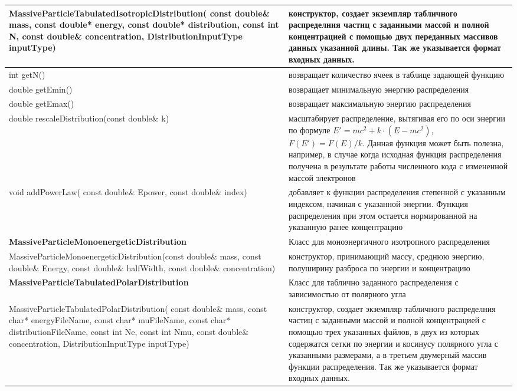 \begin{small}
\begin{xtabular}{|p{0.52\textwidth}|p{0.48\textwidth}|}
		\hline
		MassiveParticleTabulatedIsotropicDistribution( const double\& mass, const double* energy, const double* distribution, const int N, const double\& concentration, DistributionInputType inputType) & конструктор, создает экземпляр табличного распределния частиц с заданными массой и полной концентрацией с помощью двух переданных массивов данных указанной длины. Так же указывается формат входных данных.\\
		\hline
		int getN() & возвращает количество ячеек в таблице задающей функцию\\
		\hline
		double getEmin() & возвращает минимальную энергию распределения\\
		\hline
		double getEmax() & возвращает максимальную энергию распределения\\
		\hline
		double rescaleDistribution(const double\& k) & масштабирует распределение, вытягивая его по оси энергии по формуле $E' = mc^2 + k\cdot(E-mc^2)$, $F(E')=F(E)/k$. Данная функция может быть полезна, например, в случае когда исходная функция распределения получена в результате работы численного кода с измененной массой электронов\\
		\hline
		void addPowerLaw( const double\& Epower, const double\& index) & добавляет к функции распределения степенной с указанным индексом, начиная с указанной энергии. Функция распределения при этом остается нормированной на указанную ранее концентрацию\\
		\hline
		\textbf{MassiveParticleMonoenergeticDistribution} & Класс для моноэнергичного изотропного распределения\\
		\hline
		MassiveParticleMonoenergeticDistribution(const double\& mass, const double\& Energy, const double\& halfWidth, const double\& concentration) & конструктор, принимающий массу, среднюю энергию, полуширину разброса по энергии и концентрацию\\
		\hline 
		\textbf{MassiveParticleTabulatedPolarDistribution} & Класс для таблично заданного распределения с зависимостью от полярного угла\\
		\hline
		MassiveParticleTabulatedPolarDistribution( const double\& mass, const char* energyFileName, const char* muFileName, const char* distributionFileName, const int Ne, const int Nmu, const double\& concentration, DistributionInputType inputType) & конструктор, создает экземпляр табличного распределния частиц с заданными массой и полной концентрацией с помощью  трех указанных файлов, в двух из которых содержатся сетки по энергии и косинусу полярного угла с указанными размерами, а в третьем двумерный массив функции распределения. Так же указывается формат входных данных.\\

\end{xtabular}
\end{small}
